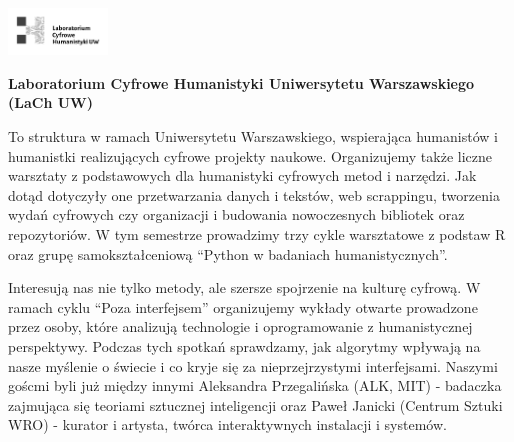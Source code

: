 \documentclass[\main/boa.tex]{subfiles}
\begin{document}
	
	\begin{minipage}[t]{0.915\textwidth}
		\center     
		\includegraphics[width=100px]{img/logos.bw/lach.png} 
	\end{minipage}
	\begin{center}
	\Large \textbf {Laboratorium Cyfrowe Humanistyki Uniwersytetu Warszawskiego (LaCh UW)}
	\end{center}
	
	\vskip 0.3cm
	\normalsize 
	To struktura w ramach Uniwersytetu Warszawskiego, wspierająca humanistów i humanistki realizujących cyfrowe projekty naukowe. Organizujemy także liczne warsztaty z podstawowych dla humanistyki cyfrowych metod i narzędzi. Jak dotąd dotyczyły one przetwarzania danych i tekstów, web scrappingu, tworzenia wydań cyfrowych czy organizacji i budowania nowoczesnych bibliotek oraz repozytoriów. W tym semestrze prowadzimy trzy cykle warsztatowe z podstaw R oraz grupę samokształceniową “Python w badaniach humanistycznych”.
	
	Interesują nas nie tylko metody, ale szersze spojrzenie na kulturę cyfrową. W ramach cyklu “Poza interfejsem” organizujemy wykłady otwarte prowadzone przez osoby, które analizują technologie i oprogramowanie z humanistycznej perspektywy. Podczas tych spotkań sprawdzamy, jak algorytmy wpływają na nasze myślenie o świecie i co kryje się za nieprzejrzystymi interfejsami. Naszymi goścmi byli już między innymi Aleksandra Przegalińska (ALK, MIT) - badaczka zajmująca się teoriami sztucznej inteligencji oraz Paweł Janicki (Centrum Sztuki WRO) - kurator i artysta, twórca interaktywnych instalacji i systemów.
	
	\vskip 1.5cm
\end{document}
